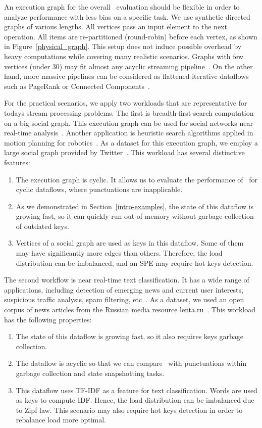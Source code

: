 An execution graph for the overall \tracker\ evaluation should be flexible in order to analyze performance with less bias on a specific task. We use synthetic directed graphs of various lengths. All vertices pass an input element to the next operation. All items are re-partitioned (round-robin) before each vertex, as shown in Figure~\ref{physical_graph}. This setup does not induce possible overhead by heavy computations while covering many realistic scenarios. Graphs with few vertices (under 30) may fit almost any acyclic streaming pipeline~\cite{akidau2018streaming}. On the other hand, more massive pipelines can be considered as flattened iterative dataflows such as PageRank or Connected Components~\cite{Murray:2013:NTD:2517349.2522738, xu2016efficient}.

For the practical scenarios, we apply two workloads that are representative for todays stream processing problems. The first is breadth-first-search computation on a big social graph. This execution graph can be used for social networks near real-time analysis~\cite{wang2011understanding}. Another application is heuristic search algorithms applied in motion planning for robotics~\cite{sud2007real}. As a dataset for this execution graph, we employ a large social graph provided by Twitter~\cite{kwak2010twitter}. This workload has several distinctive features:
\begin{enumerate}
    \item The execution graph is cyclic. It allows us to evaluate the performance of \tracker\ for cyclic dataflows, where punctuations are inapplicable.
    \item As we demonstrated in Section~\ref{intro-examples}, the state of this dataflow is growing fast, so it can quickly run out-of-memory without garbage collection of outdated keys.
    \item Vertices of a social graph are used as keys in this dataflow. Some of them may have significantly more edges than others. Therefore, the load distribution can be imbalanced, and an SPE may require hot keys detection.
\end{enumerate}

The second workflow is near real-time text classification. It has a wide range of applications, including detection of emerging news and current user interests, suspicious traffic analysis, spam filtering, etc~\cite{webirte}. As a dataset, we used an open corpus of news articles from the Russian media resource lenta.ru~\cite{lentaru}. This workload has the following properties:
\begin{enumerate}
    \item The state of this dataflow is growing fast, so it also requires keys garbage collection.
    \item The dataflow is acyclic so that we can compare \tracker\ with punctuations within garbage collection and state snapshotting tasks.
    \item This dataflow uses TF-IDF as a feature for text classification. Words are used as keys to compute IDF. Hence, the load distribution can be imbalanced due to Zipf law. This scenario may also require hot keys detection in order to rebalance load more optimal. 
\end{enumerate}

